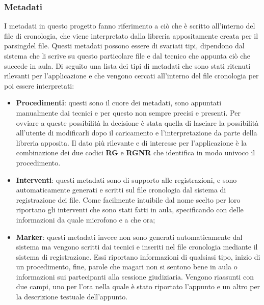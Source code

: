 \subsubsection{Metadati}
I metadati in questo progetto fanno riferimento a ciò che è scritto all'interno del file di cronologia, che viene interpretato dalla libreria appositamente creata per il \gls{parsing}\glsfirstoccur del file.
Questi metadati possono essere di svariati tipi, dipendono dal sistema che li scrive su questo particolare file e dal tecnico che appunta ciò che succede in aula. Di seguito una lista
dei tipi di metadati che sono stati ritenuti rilevanti per l'applicazione e che vengono cercati all'interno del file cronologia per poi essere interpretati:
\begin{itemize}
  \item \textbf{Procedimenti}: questi sono il cuore dei metadati, sono appuntati manualmente dai tecnici e per questo non sempre precisi e presenti. Per ovviare a queste possibilità
        la decisione è stata quella di lasciare la possibilità all'utente di modificarli dopo il caricamento e l'interpretazione da parte della libreria apposita. Il dato più rilevante e
        di interesse per l'applicazione è la combinazione dei due codici \textbf{RG} e \textbf{RGNR} che identifica in modo univoco il procedimento.
  \item \textbf{Interventi}: questi metadati sono di supporto alle registrazioni, e sono automaticamente generati e scritti sul file cronologia dal sistema di registrazione dei file. Come
        facilmente intuibile dal nome scelto per loro riportano gli interventi che sono stati fatti in aula, specificando con delle informazioni da quale microfono e a che ora;
  \item \textbf{Marker}: questi metadati invece non sono generati automaticamente dal sistema ma vengono scritti dai tecnici e inseriti nel file cronologia mediante il sistema di registrazione.
        Essi riportano informazioni di qualsiasi tipo, inizio di un procedimento, fine, parole che magari non si sentono bene in aula o informazioni sui partecipanti alla sessione giudiziaria.
        Vengono riassunti con due campi, uno per l'ora nella quale è stato riportato l'appunto e un altro per la descrizione testuale dell'appunto.
\end{itemize}

